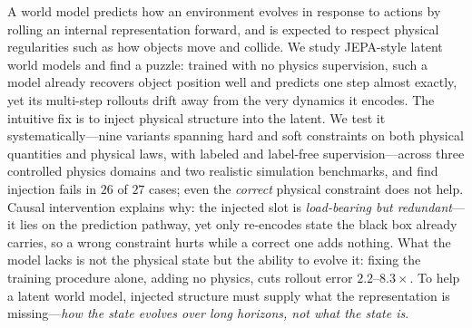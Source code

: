     A world model predicts how an environment evolves in response to actions by rolling an internal representation forward, and is expected to respect physical regularities such as how objects move and collide.
    We study JEPA-style latent world models and find a puzzle: trained with no physics supervision, such a model already recovers object position well and predicts one step almost exactly, yet its multi-step rollouts drift away from the very dynamics it encodes.
    The intuitive fix is to inject physical structure into the latent.
    We test it systematically---nine variants spanning hard and soft constraints on both physical quantities and physical laws, with labeled and label-free supervision---across three controlled physics domains and two realistic simulation benchmarks, and find injection fails in $26$ of $27$ cases; even the \emph{correct} physical constraint does not help.
    Causal intervention explains why: the injected slot is \emph{load-bearing but redundant}---it lies on the prediction pathway, yet only re-encodes state the black box already carries, so a wrong constraint hurts while a correct one adds nothing.
    What the model lacks is not the physical state but the ability to evolve it: fixing the training procedure alone, adding no physics, cuts rollout error $2.2$--$8.3\times$.
    To help a latent world model, injected structure must supply what the representation is missing---\emph{how the state evolves over long horizons, not what the state is}.

